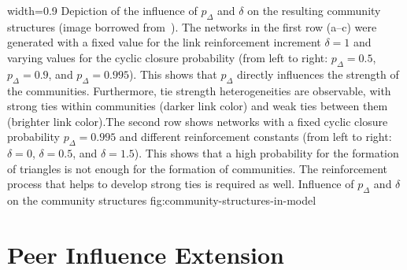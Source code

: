       {width=0.9\textwidth}
      {Depiction of the influence of \( p_{\Delta} \) and \( \delta \) on the resulting community structures (image borrowed from~\cite{Laurent2015}). The networks in the first row (a--c) were generated with a fixed value for the link reinforcement increment \(\delta = 1\) and varying values for the cyclic closure probability (from left to right: \( p_{\Delta} = 0.5 \), \( p_{\Delta} = 0.9 \), and \( p_{\Delta} = 0.995 \)). This shows that \( p_{\Delta} \) directly influences the strength of the communities. Furthermore, tie strength heterogeneities are observable, with strong ties within communities (darker link color) and weak ties between them (brighter link color).The second row shows networks with a fixed cyclic closure probability \( p_{\Delta} = 0.995 \) and different reinforcement constants (from left to right: \(\delta = 0\), \(\delta = 0.5\), and \(\delta = 1.5\)). This shows that a high probability for the formation of triangles is not enough for the formation of communities. The reinforcement process that helps to develop strong ties is required as well.}
      {Influence of \( p_{\Delta} \) and \( \delta \) on the community structures}
      {fig:community-structures-in-model}




\section{Peer Influence Extension}
\label{sec:peer-influence-model}

